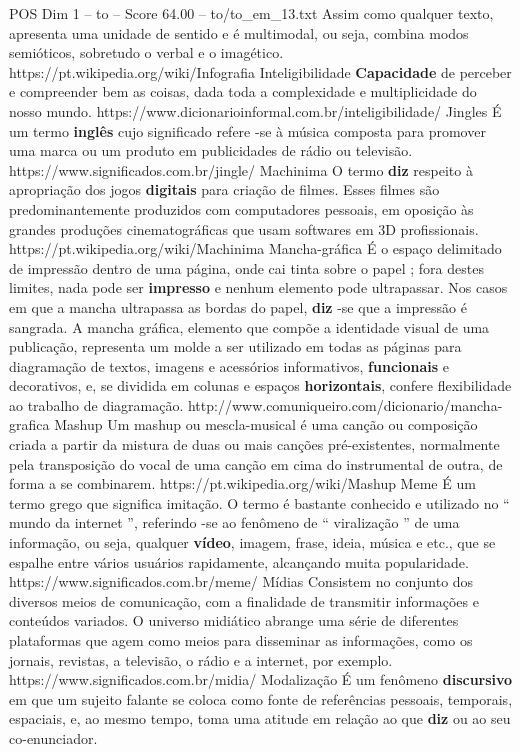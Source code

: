 \begin{textsample}{POS Dim 1 – to – Score 64.00 – to/to\_em\_13.txt}
Assim como qualquer texto, apresenta uma unidade de sentido e é multimodal, ou seja, combina modos semióticos, sobretudo o verbal e o imagético. https://pt.wikipedia.org/wiki/Infografia Inteligibilidade \textbf{Capacidade} de perceber e compreender bem as coisas, dada toda a complexidade e multiplicidade do nosso mundo. https://www.dicionarioinformal.com.br/inteligibilidade/ Jingles É um termo \textbf{inglês} cujo significado refere -se à música composta para promover uma marca ou um produto em publicidades de rádio ou televisão. https://www.significados.com.br/jingle/ Machinima O termo \textbf{diz} respeito à apropriação dos jogos \textbf{digitais} para criação de filmes.
Esses filmes são predominantemente produzidos com computadores pessoais, em oposição às grandes produções cinematográficas que usam softwares em 3D profissionais. https://pt.wikipedia.org/wiki/Machinima Mancha-gráfica É o espaço delimitado de impressão dentro de uma página, onde cai tinta sobre o papel ; fora destes limites, nada pode ser \textbf{impresso} e nenhum elemento pode ultrapassar.
Nos casos em que a mancha ultrapassa as bordas do papel, \textbf{diz} -se que a impressão é sangrada.
A mancha gráfica, elemento que compõe a identidade visual de uma publicação, representa um molde a ser utilizado em todas as páginas para diagramação de textos, imagens e acessórios informativos, \textbf{funcionais} e decorativos, e, se dividida em colunas e espaços \textbf{horizontais}, confere flexibilidade ao trabalho de diagramação. http://www.comuniqueiro.com/dicionario/mancha-grafica Mashup Um mashup ou mescla-musical é uma canção ou composição criada a partir da mistura de duas ou mais canções pré-existentes, normalmente pela transposição do vocal de uma canção em cima do instrumental de outra, de forma a se combinarem. https://pt.wikipedia.org/wiki/Mashup Meme É um termo grego que significa imitação.
O termo é bastante conhecido e utilizado no “ mundo da internet ”, referindo -se ao fenômeno de “ viralização ” de uma informação, ou seja, qualquer \textbf{vídeo}, imagem, frase, ideia, música e etc., que se espalhe entre vários usuários rapidamente, alcançando muita popularidade. https://www.significados.com.br/meme/ Mídias Consistem no conjunto dos diversos meios de comunicação, com a finalidade de transmitir informações e conteúdos variados.
O universo midiático abrange uma série de diferentes plataformas que agem como meios para disseminar as informações, como os jornais, revistas, a televisão, o rádio e a internet, por exemplo. https://www.significados.com.br/midia/ Modalização É um fenômeno \textbf{discursivo} em que um sujeito falante se coloca como fonte de referências pessoais, temporais, espaciais, e, ao mesmo tempo, toma uma atitude em relação ao que \textbf{diz} ou ao seu co-enunciador.

\end{textsample}
